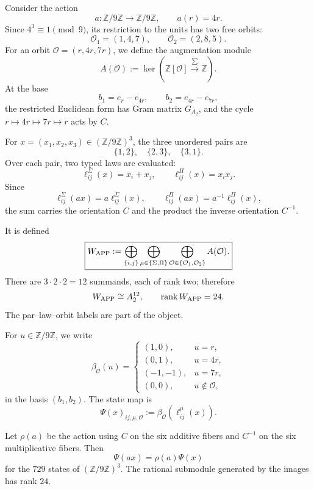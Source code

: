 Consider the action
\[
 a:\mathbb Z/9\mathbb Z\longrightarrow\mathbb Z/9\mathbb Z,
 \qquad a(r)=4r.
\]
Since \(4^3\equiv1\pmod9\), its restriction to the units has two free
orbits:
\[
 \mathcal O_1=(1,4,7),
 \qquad
 \mathcal O_2=(2,8,5).
\]
For an orbit \(\mathcal O=(r,4r,7r)\), we define the augmentation module
\[
 A(\mathcal O):=
 \ker\!\left(\mathbb Z[\mathcal O]
 \xrightarrow{\,\sum\,}\mathbb Z\right).
\]
At the base
\[
 b_1=e_r-e_{4r},
 \qquad b_2=e_{4r}-e_{7r},
\]
the restricted Euclidean form has Gram matrix \(G_{A_2}\), and the cycle
\(r\mapsto4r\mapsto7r\mapsto r\) acts by \(C\).

For \(x=(x_1,x_2,x_3)\in(\mathbb Z/9\mathbb Z)^3\), the three unordered pairs are
\[
 \{1,2\},\quad\{2,3\},\quad\{3,1\}.
\]
Over each pair, two typed laws are evaluated:
\[
 \ell_{ij}^{\Sigma}(x)=x_i+x_j,
 \qquad
 \ell_{ij}^{\Pi}(x)=x_ix_j.
\]
Since
\[
 \ell_{ij}^{\Sigma}(ax)=a\ell_{ij}^{\Sigma}(x),
 \qquad
 \ell_{ij}^{\Pi}(ax)=a^{-1}\ell_{ij}^{\Pi}(x),
\]
the sum carries the orientation \(C\) and the product the inverse orientation
\(C^{-1}\).

\begin{definition}
\label{p12-83-c1-s5:def:modulo-ciclotomico-app-autonomo}
It is defined
\[
 \boxed{
 W_{\rm APP}:=
 \bigoplus_{\{i,j\}}
 \bigoplus_{\mu\in\{\Sigma,\Pi\}}
 \bigoplus_{\mathcal O\in\{\mathcal O_1,\mathcal O_2\}}
 A(\mathcal O).}
\]
There are \(3\cdot2\cdot2=12\) summands, each of rank two; therefore
\[
 W_{\rm APP}\cong A_2^{12},
 \qquad \operatorname{rank}W_{\rm APP}=24.
\]
The par--law--orbit labels are part of the object.
\end{definition}

For \(u\in\mathbb Z/9\mathbb Z\), we write
\[
 \beta_{\mathcal O}(u)=
 \begin{cases}
 (1,0),&u=r,\\
 (0,1),&u=4r,\\
 (-1,-1),&u=7r,\\
 (0,0),&u\notin\mathcal O,
 \end{cases}
\]
in the basis \((b_1,b_2)\). The state map is
\[
 \Psi(x)_{ij,\mu,\mathcal O}
 :=\beta_{\mathcal O}(\ell_{ij}^{\mu}(x)).
\]

\begin{theorem}
\label{p12-83-c1-s5:thm:esqueleto-estatal-app-autonomo}
Let \(\rho(a)\) be the action using \(C\) on the six additive
fibers and \(C^{-1}\) on the six multiplicative fibers. Then
\[
 \boxed{\Psi(ax)=\rho(a)\Psi(x)}
\]
for the \(729\) states of \((\mathbb Z/9\mathbb Z)^3\). The rational submodule
generated by the images has rank \(24\).
\end{theorem}

